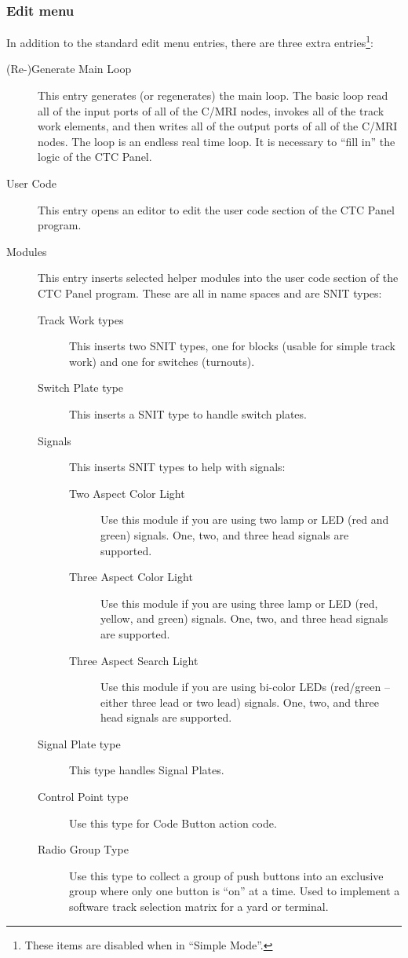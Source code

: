 \subsubsection{Edit menu}

In addition to the standard edit menu entries, there are three extra
entries\footnote{These items are disabled when in ``Simple Mode''.}:

\begin{description}
  \item[(Re-)Generate Main Loop] This entry generates (or regenerates)
the main loop.  The basic loop read all of the input ports of all of the
C/MRI nodes, invokes all of the track work elements, and then writes all
of the output ports of all of the C/MRI nodes.  The loop is an endless
real time loop.  It is necessary to ``fill in'' the logic of the CTC Panel.
  \item[User Code] This entry opens an editor to edit the user code
section of the CTC Panel program.
  \item[Modules] This entry inserts selected helper modules into the
user code section of the CTC Panel program.  These are all in name spaces
and are SNIT types:
    \begin{description}
      \item[Track Work types] This inserts two SNIT types, one for
blocks (usable for simple track work) and one for switches (turnouts).
      \item[Switch Plate type] This inserts a SNIT type to handle switch
plates. 
      \item[Signals] This inserts SNIT types to help with signals:
	\begin{description}
	   \item[Two Aspect Color Light] Use this module if you are
using two lamp or LED (red and green) signals.  One, two, and three head
signals are supported.
	   \item[Three Aspect Color Light] Use this module if you are
using three  lamp or LED (red,  yellow,  and green) signals.  One, two,
and three head signals are supported.
	   \item[Three Aspect Search Light] Use this module if you are 
using bi-color LEDs (red/green -- either three lead or two lead)
signals.  One, two, and three head signals are supported.
	\end{description}
      \item[Signal Plate type] This type handles Signal Plates.
      \item[Control Point type] Use this type for Code Button action code.
      \item[Radio Group Type] Use this type to collect a group of push 
buttons into an exclusive group where only one button is ``on'' at a
time.  Used to implement a software track selection matrix for a yard or
terminal.
    \end{description}
\end{description}

